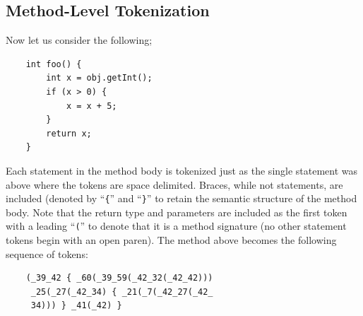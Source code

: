 \documentclass{article}
\begin{document}
\subsection{Method-Level Tokenization}

Now let us consider the following;

\begin{verbatim}
    int foo() {
        int x = obj.getInt();
        if (x > 0) {
            x = x + 5;
        }
        return x;
    }
\end{verbatim}

Each statement in the method body is tokenized just as the single statement 
was above where the tokens are space delimited. Braces, while not 
statements, are included (denoted by ``\texttt\{'' and
``\texttt\}''  to retain the semantic structure of the method body. 
Note that the return type and parameters are included as the first 
token with a leading ``\texttt('' to denote that it is a method
signature (no other statement tokens begin with an open paren).
The method above becomes the following sequence of tokens:

\begin{verbatim}
    (_39_42 { _60(_39_59(_42_32(_42_42)))
     _25(_27(_42_34) { _21(_7(_42_27(_42_
     34))) } _41(_42) } 
\end{verbatim}

\end{document}
